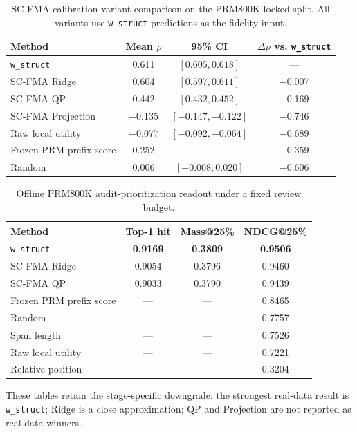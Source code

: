 \documentclass[a4paper,fleqn]{cas-sc}
\begin{document}
\begin{table}[ht]
\caption{SC-FMA calibration variant comparison on the PRM800K locked split. All variants use \texttt{w\_struct} predictions as the fidelity input.}
\label{tab:supp-scfma-variants}
\centering
\small
\begin{tabular}{lccc}
\toprule
\textbf{Method} & \textbf{Mean $\rho$} & \textbf{95\% CI} & \textbf{$\Delta\rho$ vs. \texttt{w\_struct}} \\
\midrule
\texttt{w\_struct} & 0.611 & $[0.605,0.618]$ & --- \\
SC-FMA Ridge & 0.604 & $[0.597,0.611]$ & $-$0.007 \\
SC-FMA QP & 0.442 & $[0.432,0.452]$ & $-$0.169 \\
SC-FMA Projection & $-$0.135 & $[-0.147,-0.122]$ & $-$0.746 \\
Raw local utility & $-$0.077 & $[-0.092,-0.064]$ & $-$0.689 \\
Frozen PRM prefix score & 0.252 & --- & $-$0.359 \\
Random & 0.006 & $[-0.008,0.020]$ & $-$0.606 \\
\bottomrule
\end{tabular}
\end{table}

\begin{table}[ht]
\caption{Offline PRM800K audit-prioritization readout under a fixed review budget.}
\label{tab:supp-audit-prioritization}
\centering
\small
\begin{tabular}{lccc}
\toprule
\textbf{Method} & \textbf{Top-1 hit} & \textbf{Mass@25\%} & \textbf{NDCG@25\%} \\
\midrule
\texttt{w\_struct} & \textbf{0.9169} & \textbf{0.3809} & \textbf{0.9506} \\
SC-FMA Ridge & 0.9054 & 0.3796 & 0.9460 \\
SC-FMA QP & 0.9033 & 0.3790 & 0.9439 \\
Frozen PRM prefix score & --- & --- & 0.8465 \\
Random & --- & --- & 0.7757 \\
Span length & --- & --- & 0.7526 \\
Raw local utility & --- & --- & 0.7221 \\
Relative position & --- & --- & 0.3204 \\
\bottomrule
\end{tabular}
\end{table}

These tables retain the stage-specific downgrade: the strongest real-data result is \texttt{w\_struct}; Ridge is a close approximation; QP and Projection are not reported as real-data winners.
\end{document}
